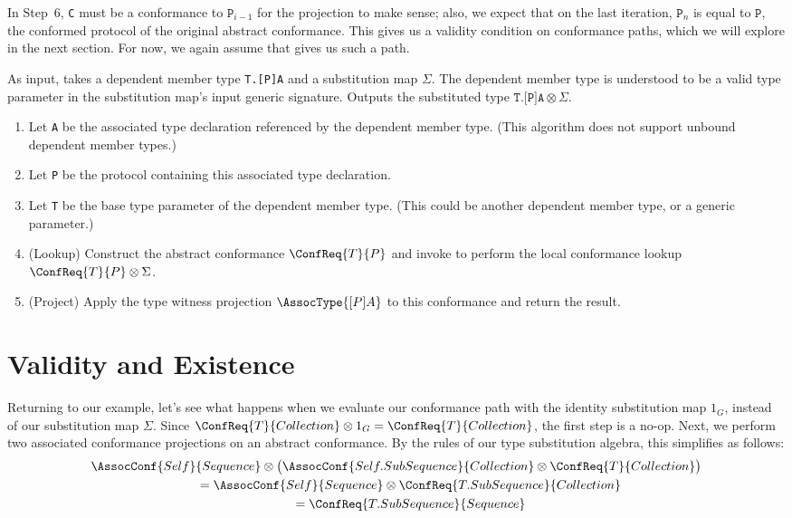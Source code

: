 \documentclass[../generics]{subfiles}
\begin{document}
In Step~6, \texttt{C} must be a conformance to $\texttt{P}_{i-1}$ for the projection to make sense; also, we expect that on the last iteration, $\texttt{P}_n$ is equal to $\texttt{P}$, the conformed protocol of the original abstract conformance. This gives us a validity condition on conformance paths, which we will explore in the next section. For now, we again assume that  gives us such a path.
\begin{algorithm}\label{dependent member type substitution}
As input, takes a dependent member type \texttt{T.[P]A} and a substitution map $\Sigma$. The dependent member type is understood to be a valid type parameter in the substitution map's input generic signature. Outputs the substituted type $\texttt{T.[P]A}\otimes\Sigma$.
\begin{enumerate}
\item Let \texttt{A} be the associated type declaration referenced by the dependent member type. (This algorithm does not support unbound dependent member types.)
\item Let \texttt{P} be the protocol containing this associated type declaration.
\item Let \texttt{T} be the base type parameter of the dependent member type. (This could be another dependent member type, or a generic parameter.)
\item (Lookup) Construct the abstract conformance $\ConfReq{T}{P}$ and invoke  to perform the local conformance lookup $\ConfReq{T}{P}\otimes\Sigma$.
\item (Project) Apply the type witness projection $\AssocType{[P]A}$ to this conformance and return the result.
\end{enumerate}
\end{algorithm}

\section{Validity and Existence}\label{conformance paths exist}

Returning to our example, let's see what happens when we evaluate our conformance path with the identity substitution map $1_G$, instead of our substitution map $\Sigma$. Since $\ConfReq{T}{Collection}\otimes 1_G=\ConfReq{T}{Collection}$, the first step is a no-op. Next, we perform two associated conformance projections on an abstract conformance. By the rules of our type substitution algebra, this simplifies as follows:
\begin{gather*}
\AssocConf{Self}{Sequence} \otimes \bigl(\AssocConf{Self.SubSequence}{Collection} \otimes \ConfReq{T}{Collection}\bigr)\\
\qquad {} = \AssocConf{Self}{Sequence} \otimes \ConfReq{T.SubSequence}{Collection}\\
\qquad {} = \ConfReq{T.SubSequence}{Sequence}
\end{gather*}
\end{document}
